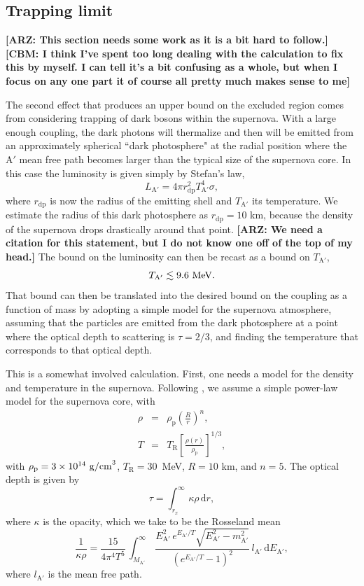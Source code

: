 \documentclass[nofootinbib,prd,superscriptaddress,twocolumn]{revtex4}
\newcommand{\beq}{\begin{equation}}
\newcommand{\eeq}{\end{equation}}
\newcommand{\bea}{\begin{eqnarray}}
\newcommand{\eea}{\end{eqnarray}}
\newcommand{\Aprime}{\mathrm{A}'}
\newcommand{\rdp}{r_{\mathrm{dp}}}
\newcommand{\dd}{\mathrm{d}}
\newcommand{\arz}[1]{{{\bf{\color{BrickRed}[ARZ: #1]}}}}
\newcommand{\cbm}[1]{{{\bf{\color{Green}[CBM: #1]}}}}
\begin{document}
\subsection{Trapping limit}

\arz{This section needs some work as it is a bit hard to follow.} 
\cbm{I think I've spent too long dealing with the calculation to fix this by myself. I can tell it's a bit confusing as a whole, but when I focus on any one part it of course all pretty much makes sense
	to me}


The second effect that produces an upper bound on the excluded region 
comes from considering trapping of dark bosons within the supernova. 
With a large enough coupling, the dark photons will thermalize and then 
will be emitted from an approximately spherical ``dark photosphere" at the radial position 
where the $\Aprime$ mean free path becomes larger than the typical size of the supernova core. 
In this case the luminosity is given simply by Stefan's law, 
\beq
L_{\mathrm{A'}}  = 4\pi \rdp^2 T_{\mathrm{A'}}^4 \sigma,
\eeq
where $\rdp$ is now the radius of the emitting shell and $T_{\mathrm{A'}}$ its temperature. 
We estimate the radius of this dark photosphere as $\rdp=10$ km, 
because the density of the supernova drops drastically around that point. 
\arz{We need a citation for this statement, but I do not know one off of the top of my head.}
The bound on the luminosity can then be recast as a bound on $T_{\mathrm{A}'}$, 
%
\beq
T_{\mathrm{A}'} \lesssim 9.6\rm\ MeV.
\eeq
%
That bound can then be translated into the desired bound on the coupling as a function of mass by adopting a 
simple model for the supernova atmosphere, assuming that the particles are emitted from the dark photosphere 
at a point where the optical depth to scattering is $\tau = 2/3 $, and finding the temperature that corresponds 
to that optical depth. 


This is a somewhat involved calculation. First, one needs a model for 
the density and temperature in the supernova. Following \cite{turner88}, 
we assume a simple power-law model for the supernova core, with 
\bea
\rho &=& \rho_{\mathrm{p}} \left( \frac{R}{r}\right )^n,\\
T &=& T_{\mathrm{R}} \left[ \frac{\rho(r)}{\rho_{\mathrm{p}}} \right]^{1/3},
\eea
with $  \rho_{\mathrm{p}}  = 3\times10^{14}\ {\rm g/cm}^3$, $T_{\mathrm{R}} = 30$~MeV, $R = 10$ km,
and $n = 5$.
The optical depth is given by 
\beq
\tau = \int_{r_x}^{\infty}\, \kappa \rho\,  \dd r,
\eeq
where $ \kappa$ is the opacity, which we take to be the Rosseland mean 
%
\beq 
\frac{1}{\kappa \rho} = \frac{15}{4 \pi^4 T^5}\, \int_{M_{\mathrm{A'}}}^{\infty}\, 
\frac{E_{\mathrm{A'}}^2\, e^{E_{\mathrm{A'}}/T} 
\sqrt{E_{\mathrm{A'}}^2 - m_{\mathrm{A'}}^2}}
{(e^{E_{\mathrm{A'}}/T}-1)^2}\, l_{\mathrm{A'}}\, \dd E_{\mathrm{A'}},
\eeq
where $l_{\mathrm{A'}}$ is the mean free path. 
\end{document}
